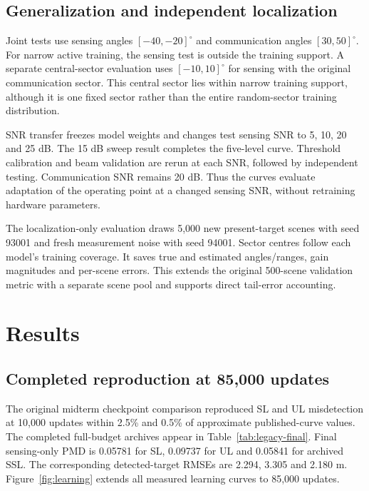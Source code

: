 \documentclass[conference]{IEEEtran}
\begin{document}
\subsection{Generalization and independent localization}
Joint tests use sensing angles $[-40,-20]^\circ$ and communication angles $[30,50]^\circ$. For narrow active training, the sensing test is outside the training support. A separate central-sector evaluation uses $[-10,10]^\circ$ for sensing with the original communication sector. This central sector lies within narrow training support, although it is one fixed sector rather than the entire random-sector training distribution.

SNR transfer freezes model weights and changes test sensing SNR to 5, 10, 20 and 25 dB. The 15 dB sweep result completes the five-level curve. Threshold calibration and beam validation are rerun at each SNR, followed by independent testing. Communication SNR remains 20 dB. Thus the curves evaluate adaptation of the operating point at a changed sensing SNR, without retraining hardware parameters.

The localization-only evaluation draws 5,000 new present-target scenes with seed 93001 and fresh measurement noise with seed 94001. Sector centres follow each model's training coverage. It saves true and estimated angles/ranges, gain magnitudes and per-scene errors. This extends the original 500-scene validation metric with a separate scene pool and supports direct tail-error accounting.
\section{Results}\label{sec:results}
\subsection{Completed reproduction at 85,000 updates}
The original midterm checkpoint comparison reproduced SL and UL misdetection at 10,000 updates within 2.5\% and 0.5\% of approximate published-curve values. The completed full-budget archives appear in Table~\ref{tab:legacy-final}. Final sensing-only PMD is 0.05781 for SL, 0.09737 for UL and 0.05841 for archived SSL. The corresponding detected-target RMSEs are 2.294, 3.305 and 2.180 m. Figure~\ref{fig:learning} extends all measured learning curves to 85,000 updates.
\end{document}
